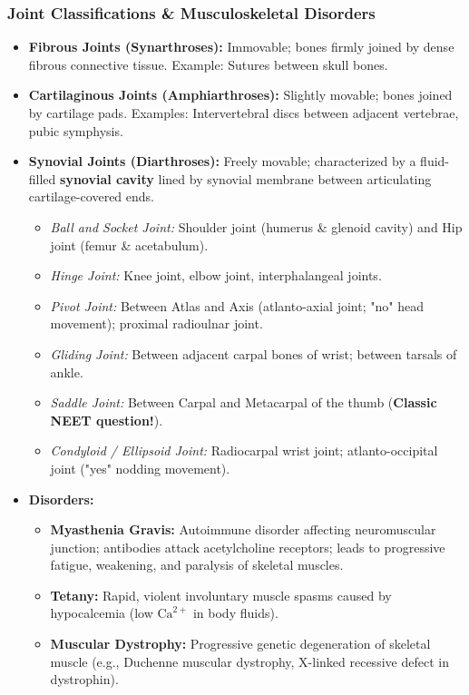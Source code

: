 \documentclass[11pt,a4paper]{article}
\begin{document}
\subsubsection{Joint Classifications \& Musculoskeletal Disorders}
\begin{itemize}[leftmargin=1.5em, itemsep=2pt]
  \item \textbf{Fibrous Joints (Synarthroses):} Immovable; bones firmly joined by dense fibrous connective tissue. Example: Sutures between skull bones.
  \item \textbf{Cartilaginous Joints (Amphiarthroses):} Slightly movable; bones joined by cartilage pads. Examples: Intervertebral discs between adjacent vertebrae, pubic symphysis.
  \item \textbf{Synovial Joints (Diarthroses):} Freely movable; characterized by a fluid-filled \textbf{synovial cavity} lined by synovial membrane between articulating cartilage-covered ends.
  \begin{itemize}[label=$\circ$]
    \item \textit{Ball and Socket Joint:} Shoulder joint (humerus \& glenoid cavity) and Hip joint (femur \& acetabulum).
    \item \textit{Hinge Joint:} Knee joint, elbow joint, interphalangeal joints.
    \item \textit{Pivot Joint:} Between Atlas and Axis (atlanto-axial joint; "no" head movement); proximal radioulnar joint.
    \item \textit{Gliding Joint:} Between adjacent carpal bones of wrist; between tarsals of ankle.
    \item \textit{Saddle Joint:} Between Carpal and Metacarpal of the thumb (\textbf{Classic NEET question!}).
    \item \textit{Condyloid / Ellipsoid Joint:} Radiocarpal wrist joint; atlanto-occipital joint ("yes" nodding movement).
  \end{itemize}
  \item \textbf{Disorders:}
  \begin{itemize}[label=$\circ$]
    \item \textbf{Myasthenia Gravis:} Autoimmune disorder affecting neuromuscular junction; antibodies attack acetylcholine receptors; leads to progressive fatigue, weakening, and paralysis of skeletal muscles.
    \item \textbf{Tetany:} Rapid, violent involuntary muscle spasms caused by hypocalcemia (low $\text{Ca}^{2+}$ in body fluids).
    \item \textbf{Muscular Dystrophy:} Progressive genetic degeneration of skeletal muscle (e.g., Duchenne muscular dystrophy, X-linked recessive defect in dystrophin).

\end{itemize}
\end{itemize}
\end{document}
